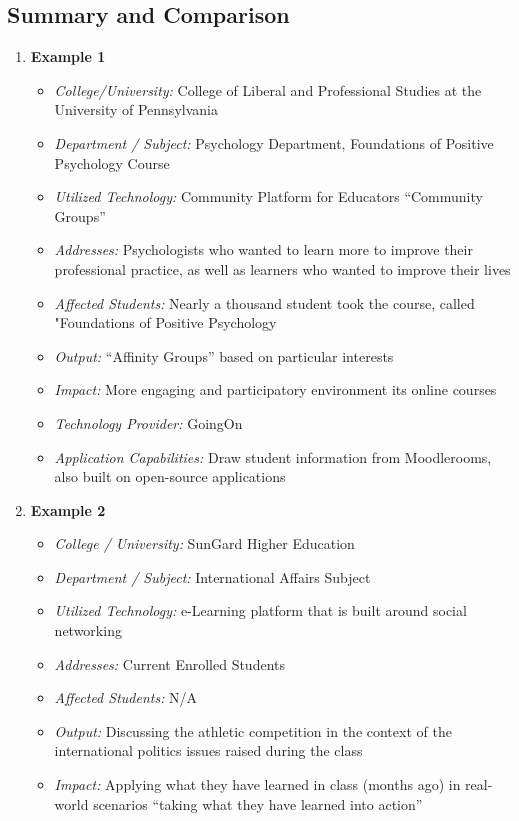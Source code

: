\documentclass[12pt,a4paper,final,twoside,onecolumn,titlepage]{book}
\begin{document}
\subsection{Summary and Comparison}
\label{Web2CompaisonSummary}
\begin{enumerate}
\item \textbf{Example 1}
\begin{itemize}
\item \textit{College/University:} College of Liberal and Professional Studies at the University of Pennsylvania
\item \textit{Department / Subject:} Psychology Department, Foundations of Positive Psychology Course
\item \textit{Utilized Technology:} Community Platform for Educators “Community Groups”
\item \textit{Addresses:} Psychologists who wanted to learn more to improve their professional practice, as well as learners who wanted to improve their lives
\item \textit{Affected Students:} Nearly a thousand student took the course, called "Foundations of Positive Psychology
\item \textit{Output:} “Affinity Groups” based on particular interests
\item \textit{Impact:} More engaging and participatory environment its online courses
\item \textit{Technology Provider:} GoingOn
\item \textit{Application Capabilities:} Draw student information from Moodlerooms, also built on open-source applications
\end{itemize}
\item \textbf{Example 2}
\begin{itemize}
\item \textit{College / University:} SunGard Higher Education
\item \textit{Department / Subject:} International Affairs Subject
\item \textit{Utilized Technology:} e-Learning platform that is built around social networking
\item \textit{Addresses:} Current Enrolled Students
\item \textit{Affected Students:} N/A
\item \textit{Output:} Discussing the athletic competition in the context of the international politics issues raised during the class
\item \textit{Impact:} Applying what they have learned in class (months ago) in real-world scenarios “taking what they have learned into action” 

\end{itemize}
\end{enumerate}
\end{document}

